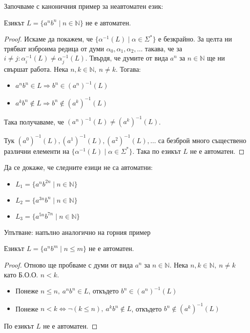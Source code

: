 \pagebreak

Започваме с каноничния пример за неавтоматен език:

\begin{claim}
    Езикът $L = \{ a^nb^n \mid n \in \mathbb{N} \}$ не е автоматен.
\end{claim}

\begin{proof}
    Искаме да покажем, че $\{ \alpha^{-1}(L) \mid \alpha \in \Sigma^* \}$ е безкрайно.
    За целта ни трябват изброима редица от думи $\alpha_0, \alpha_1, \alpha_2, \dots$ такава, че за $i \neq j : \alpha_i^{-1}(L) \neq \alpha_j^{-1}(L)$.
    Твърдя, че думите от вида $a^n$ за $n \in \mathbb{N}$ ще ни свършат работа.
    Нека $n, k \in \mathbb{N}, \: n \neq k$.
    Тогава:
    \begin{itemize}
        \item $a^nb^n \in L \Rightarrow b^n \in (a^n)^{-1}(L)$
        \item $a^kb^n \notin L \Rightarrow b^n \notin (a^k)^{-1}(L)$
    \end{itemize}
    Така получаваме, че $(a^n)^{-1}(L) \neq (a^k)^{-1}(L)$.

    Тук $(a^0)^{-1}(L), (a^1)^{-1}(L), (a^2)^{-1}(L), \dots$ са безброй много съществено различни елементи на $\{ \alpha^{-1}(L) \mid \alpha \in \Sigma^* \}$.
    Така по  езикът $L$ не е автоматен.
\end{proof}

\begin{problem}
Да се докаже, че следните езици не са автоматни:
\begin{itemize}
    \item $L_1 = \{ a^nb^{2n} \mid n \in \mathbb{N} \}$
    \item $L_2 = \{ a^{3n}b^n \mid n \in \mathbb{N} \}$
    \item $L_3 = \{ a^{5n}b^{7n} \mid n \in \mathbb{N} \}$
\end{itemize}
Упътване: напълно аналогично на горния пример
\end{problem}

\begin{claim}
    Езикът $L = \{ a^nb^m \mid n \leq m \}$ не е автоматен.
\end{claim}

\begin{proof}
    Отново ще пробваме с думи от вида $a^n$ за $n \in \mathbb{N}$.
    Нека $n, k \in \mathbb{N}, \: n \neq k$ като Б.О.О. $n < k$.
    \begin{itemize}
        \item Понеже $n \leq n, \: a^nb^n \in L$, откъдето $b^n \in (a^n)^{-1}(L)$
        \item Понеже $n < k \iff \neg(k \leq n), \: a^kb^n \notin L$, откъдето $b^n \notin (a^k)^{-1}(L)$
    \end{itemize}
    По  езикът $L$ не е автоматен.
\end{proof}